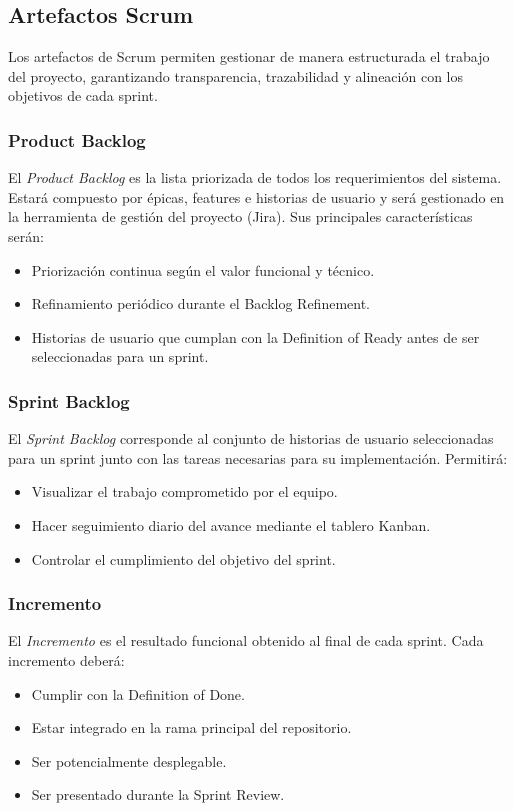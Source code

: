 \documentclass[12pt]{article}
\begin{document}
\subsection{Artefactos Scrum} Los artefactos de Scrum permiten gestionar de manera estructurada el trabajo del proyecto, garantizando transparencia, trazabilidad y alineación con los objetivos de cada sprint. \subsubsection{Product Backlog} El \textit{Product Backlog} es la lista priorizada de todos los requerimientos del sistema. Estará compuesto por épicas, features e historias de usuario y será gestionado en la herramienta de gestión del proyecto (Jira). Sus principales características serán: \begin{itemize} \item Priorización continua según el valor funcional y técnico. \item Refinamiento periódico durante el Backlog Refinement. \item Historias de usuario que cumplan con la Definition of Ready antes de ser seleccionadas para un sprint. \end{itemize} \subsubsection{Sprint Backlog} El \textit{Sprint Backlog} corresponde al conjunto de historias de usuario seleccionadas para un sprint junto con las tareas necesarias para su implementación. Permitirá: \begin{itemize} \item Visualizar el trabajo comprometido por el equipo. \item Hacer seguimiento diario del avance mediante el tablero Kanban. \item Controlar el cumplimiento del objetivo del sprint. \end{itemize} \subsubsection{Incremento} El \textit{Incremento} es el resultado funcional obtenido al final de cada sprint. Cada incremento deberá: \begin{itemize} \item Cumplir con la Definition of Done. \item Estar integrado en la rama principal del repositorio. \item Ser potencialmente desplegable. \item Ser presentado durante la Sprint Review. \end{itemize}
\end{document}

